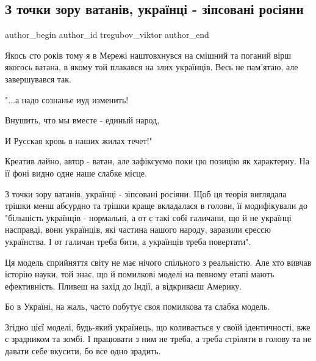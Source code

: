  
 
 
 
 
 
\subsection{З точки зору ватанів, українці - зіпсовані росіяни}
\label{sec:26_09_2021.fb.tregubov_viktor.1.identichnost_model}
 
\ifcmt
 author_begin
   author_id tregubov_viktor
 author_end
\fi

Якось сто років тому я в Мережі наштовхнувся на смішний та поганий вірш якогось
ватана, в якому той плакався на злих українців. Весь не пам'ятаю, але
завершувався так.

"...а надо сознанье иуд изменить!

Внушить, что мы вместе - единый народ,

И Русская кровь в наших жилах течет!"

Креатив лайно, автор - ватан, але зафіксуємо поки цю позицію як характерну. На
її фоні видно одне наше слабке місце.

З точки зору ватанів, українці - зіпсовані росіяни. Щоб ця теорія виглядала
трішки менш абсурдно та трішки краще вкладалася в голови, її модифікували до
"більшість українців - нормальні, а от є такі собі галичани, що й не українці
насправді, вони українців, які частина нашого народу, заразили єрессю
українства. І от галичан треба бити, а українців треба повертати".

Ця модель сприйняття світу не має нічого спільного з реальністю. Але хто вивчав
історію науки, той знає, що й помилкові моделі на певному етапі мають
ефективність. Пливеш на захід до Індії, а відкриваєш Америку.

Бо в Україні, на жаль, часто побутує своя помилкова та слабка модель.

Згідно цієї моделі, будь-який українець, що коливається у своїй ідентичності,
вже є зрадником та зомбі. І працювати з ним не треба, а треба стріляти в голову
та не давати себе вкусити, бо все одно зрадить.

